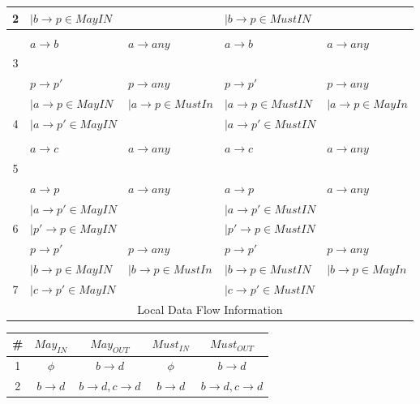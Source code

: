 \documentclass[12pt]{article}
\begin{document}
\begin{enumerate}
{\begin{center}
\begin{tabular}{|c||l|l||l|l|}
  2 & $| b\rightarrow p \in MayIN$ & &  $| b\rightarrow p \in MustIN$& \\ \hline
  & & & & \\
  & $a\rightarrow b$ & $a\rightarrow any$ & $a\rightarrow b$ & $a\rightarrow any$ \\
  3 & & & & \\ \hline
  & $p \rightarrow p'$ & $p \rightarrow any$ & $p \rightarrow p'$ & $p \rightarrow any$ \\
  & $| a\rightarrow p \in MayIN$& $| a\rightarrow p \in
  MustIn$ & $| a\rightarrow p \in MustIN$& $| a\rightarrow p \in
  MayIn$\\
  4 & $| a\rightarrow p' \in MayIN$& & $| a\rightarrow p' \in MustIN$& \\ \hline
  & & & & \\
  & $a\rightarrow c$ & $a\rightarrow any$ & $a\rightarrow c$ & $a\rightarrow any$ \\
  5 & & & & \\ \hline
  & $a\rightarrow p$ & $a\rightarrow any$ & $a\rightarrow
  p$ & $a\rightarrow any$ \\
  & $| a\rightarrow p' \in MayIN$ & & $| a\rightarrow p' \in MustIN$ & \\ 
  6 & $| p'\rightarrow p \in MayIN$ & & $| p'\rightarrow p
  \in MustIN$ & \\ \hline
  & $p \rightarrow p'$ & $p \rightarrow any$ & $p \rightarrow p'$ & $p \rightarrow any$ \\
  & $| b\rightarrow p \in MayIN$& $| b\rightarrow p \in
  MustIn$ & $| b\rightarrow p \in MustIN$& $| b\rightarrow p \in
  MayIn$\\
  7 & $| c\rightarrow p' \in MayIN$& & $| c\rightarrow p' \in MustIN$& \\ \hline
\multicolumn{5}{c}{    Local Data Flow Information}
\end{tabular}
\end{center}
\begin{center}
  \renewcommand{\arraystretch}{1.3}
  \hspace*{-25mm}\begin{tabular}{|c||c|c||c|c|} \hline
    {\bf \#} & {\bf $May_{IN}$} & {\bf $May_{OUT}$} & {\bf
      $Must_{IN}$} & {\bf $Must_{OUT}$}  \\ \hline \hline
    1 & $\phi$ & $b\rightarrow d$& $\phi$ & $b\rightarrow
    d$\\ \hline
    2 & $b\rightarrow d$ & $b\rightarrow d, c \rightarrow d$ & $b\rightarrow
    d$ & $b\rightarrow d, c \rightarrow d$ \\ \hline

\end{tabular}
\end{center}}
\end{enumerate}
\end{document}
